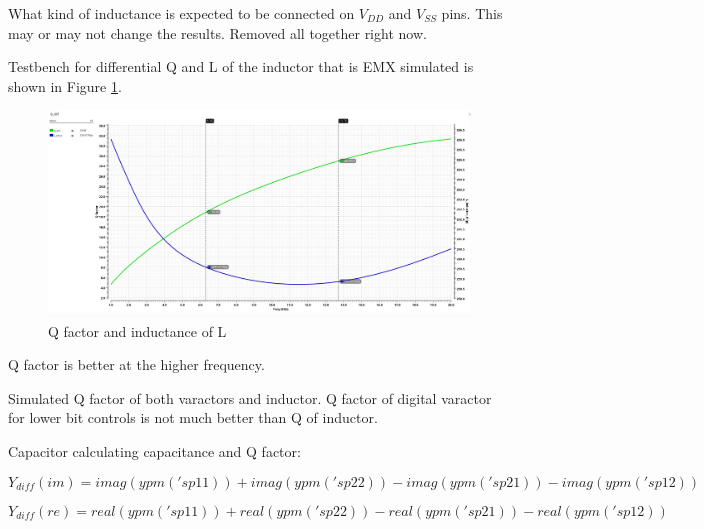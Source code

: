 \documentclass{article}
\begin{document}

\begin{question}
	What kind of inductance is expected to be connected on $V_{DD}$ and $V_{SS}$ pins. This may or may not change the results. Removed all together right now.
\end{question}

Testbench for differential Q and L of the inductor that is EMX simulated is shown in Figure \ref{fig:qlinductor}.

\begin{figure}[ht!]
	\includegraphics[width=\linewidth]{Figures/QL_inductor.png}
	\caption{Q factor and inductance of L}
	\label{fig:qlinductor}
\end{figure}

Q factor is better at the higher frequency.

Simulated Q factor of both varactors and inductor. Q factor of digital varactor for lower bit controls is not much better than Q of inductor.



Capacitor calculating capacitance and Q factor:

\begin{equation}
	Y_{diff} (im) = imag(ypm('sp 1 1)) + imag(ypm('sp 2 2)) - imag(ypm('sp 2 1)) - imag(ypm('sp 1 2))
\end{equation}

\begin{equation}
	Y_{diff} (re) = real(ypm('sp 1 1)) + real(ypm('sp 2 2)) - real(ypm('sp 2 1)) - real(ypm('sp 1 2))
\end{equation}
\end{document}
